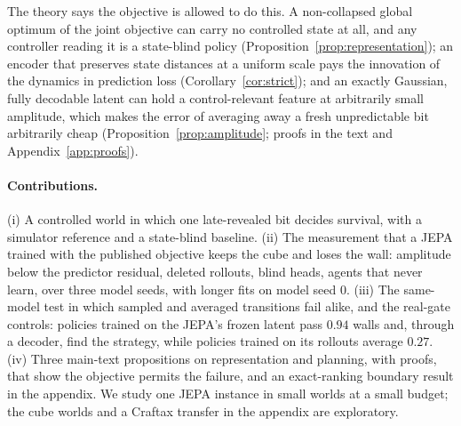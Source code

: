 The theory says the objective is allowed to do this. A non-collapsed global optimum of the joint
objective can carry no controlled state at all, and any controller reading it is a state-blind policy
(Proposition~\ref{prop:representation}); an encoder that preserves state distances at a uniform scale
pays the innovation of the dynamics in prediction loss (Corollary~\ref{cor:strict}); and an exactly Gaussian, fully decodable latent can
hold a control-relevant feature at arbitrarily small amplitude, which makes the error of averaging away a fresh unpredictable bit arbitrarily cheap (Proposition~\ref{prop:amplitude}; proofs in the text and Appendix~\ref{app:proofs}).

\paragraph{Contributions.} (i) A controlled world in which one late-revealed bit decides survival,
with a simulator reference and a state-blind baseline. (ii) The
measurement that a JEPA trained with the published objective keeps the cube and loses the wall:
amplitude below the predictor residual, deleted rollouts, blind heads, agents that never learn, over
three model seeds, with longer fits on model seed $0$. (iii) The same-model test in which sampled and averaged transitions fail alike, and the real-gate controls: policies trained on the JEPA's frozen latent pass $0.94$ walls and, through a decoder, find the strategy, while policies trained on its rollouts average $0.27$. (iv) Three main-text propositions on representation and planning, with proofs, that show the objective permits the failure, and an exact-ranking boundary result in the appendix. We study one JEPA instance in small worlds at a small budget; the cube worlds and a Craftax transfer in the appendix are exploratory.
